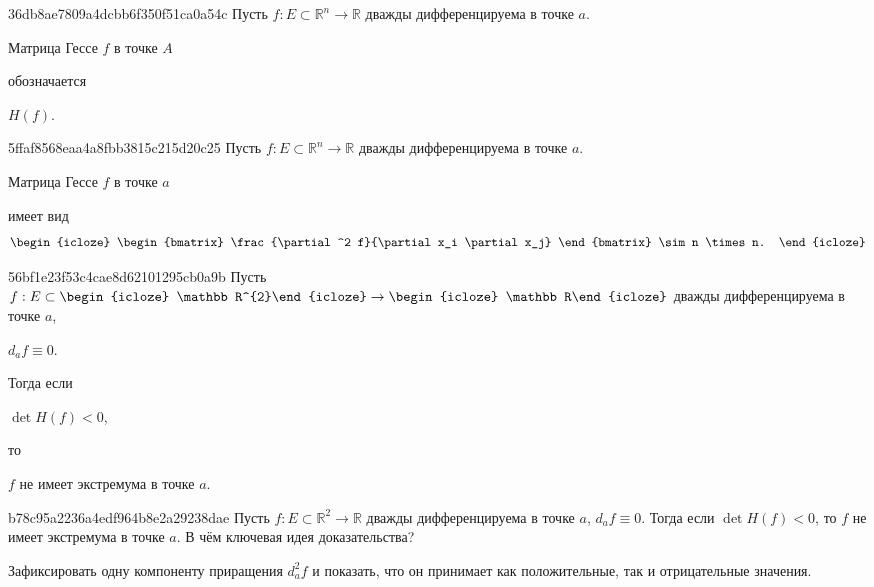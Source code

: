 \begin{note}{36db8ae7809a4dcbb6f350f51ca0a54c}
    Пусть \({ f : E \subset \mathbb R^{n} \to \mathbb R }\) дважды дифференцируема в точке \({ a }\).
    \begin{icloze}{2}Матрица Гессе \({ f }\) в точке \({ A }\)\end{icloze} обозначается \begin{icloze}{1}\({ H(f) }\).\end{icloze}
\end{note}

\begin{note}{5ffaf8568eaa4a8fbb3815c215d20c25}
    Пусть \({ f : E \subset \mathbb R^{n} \to \mathbb R }\) дважды дифференцируема в точке \({ a }\).
    \begin{icloze}{2}Матрица Гессе \({ f }\) в точке \({ a }\)\end{icloze} имеет вид
    \[
        \begin{icloze}{1}
            \begin{bmatrix}
                \frac{\partial^2 f}{\partial x_i \partial x_j}
            \end{bmatrix}
            \sim n \times n.
        \end{icloze}
    \]
\end{note}

\begin{note}{56bf1e23f53c4cae8d62101295cb0a9b}
    Пусть \({ f : E \subset \begin{icloze}{3}\mathbb R^{2}\end{icloze} \to \begin{icloze}{3}\mathbb R\end{icloze} }\) дважды дифференцируема в точке \({ a }\), \begin{icloze}{4}\({ d_{a}f \equiv 0 }\).\end{icloze}
    Тогда если \begin{icloze}{2}\({ \det H(f) < 0 }\),\end{icloze} то \begin{icloze}{1}\({ f }\) не имеет экстремума в точке \({ a }\).\end{icloze}
\end{note}

\begin{note}{b78c95a2236a4edf964b8e2a29238dae}
    Пусть \({ f : E \subset \mathbb R^{2} \to \mathbb R }\) дважды дифференцируема в точке \({ a }\), \({ d_{a}f \equiv 0 }\).
    Тогда если \({ \det H(f) < 0 }\), то \({ f }\) не имеет экстремума в точке \({ a }\).
    В чём ключевая идея доказательства?

    \begin{cloze}{1}
        Зафиксировать одну компоненту приращения \({ d_{a}^2f }\) и показать, что он принимает как положительные, так и отрицательные значения.
    \end{cloze}
\end{note}

